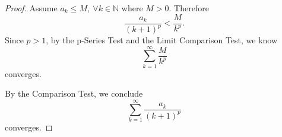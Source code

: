\begin{Exercise}
\begin{proof}
Assume $a_k \leq M,\ \forall k \in \mathbb{N} $ where $M > 0$. Therefore
$$
\frac{a_k}{(k+1)^p} < \frac{M}{k^p}. 
$$
Since $p>1$, by the p-Series Test and the Limit Comparison Test, we know 
$$
\sum_{k=1}^{\infty}\frac{M}{k^p}
$$ 
converges. 

By the Comparison Test, we conclude 
$$
\sum_{k=1}^{\infty}\frac{a_k}{(k+1)^p}
$$ 
converges.
\end{proof}
\end{Exercise}